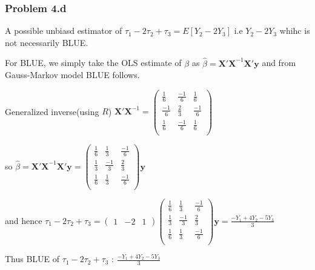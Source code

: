 \documentclass[a4paper]{article}
\begin{document}
\subsubsection*{Problem 4.d}

A possible unbiasd estimator of $\tau_1-2\tau_2+\tau_3 = E[Y_2-2Y_3]$ i.e $Y_2-2Y_3$ whihc is not necessarily BLUE.

For BLUE, we simply take the OLS estimate of $\beta$ as $\hat{\beta} = \mathbf{X'X}^{-1}\mathbf{X'y}$ and from Gauss-Markov model BLUE follows.

Generalized inverse(using $R$) $\mathbf{X'X}^{-1} = \begin{pmatrix} \frac{1}{6} & \frac{-1}{6} & \frac{1}{6}\\ 
\frac{-1}{6} & \frac{2}{3} & \frac{-1}{6}\\
\frac{1}{6} & \frac{-1}{6} & \frac{1}{6} \\
\end{pmatrix}$

so $\hat{\beta} =\mathbf{X'X}^{-1}\mathbf{X'y} = \begin{pmatrix} \frac{1}{6} & \frac{1}{3} & \frac{-1}{6}\\ 
\frac{1}{3} & \frac{-1}{3} & \frac{2}{3}\\
\frac{1}{6} & \frac{1}{3} & \frac{-1}{6}\\
\end{pmatrix}\mathbf{y}$

and hence $\tau_1-2\tau_2+\tau_3 = \begin{pmatrix} 1 &-2 &1\end{pmatrix}\begin{pmatrix} \frac{1}{6} & \frac{1}{3} & \frac{-1}{6}\\ 
\frac{1}{3} & \frac{-1}{3} & \frac{2}{3}\\
\frac{1}{6} & \frac{1}{3} & \frac{-1}{6}\\
\end{pmatrix}\mathbf{y} = \frac{-Y_1+4Y_2-5Y_3}{3}  $

Thus BLUE of  $\tau_1-2\tau_2+\tau_3$ : $ \frac{-Y_1+4Y_2-5Y_3}{3}$
\end{document}
